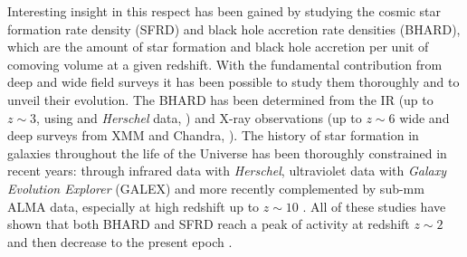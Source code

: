 
Interesting insight in this respect has been gained by studying the cosmic star formation rate density (SFRD) and black hole accretion rate densities (BHARD), which are the amount of star formation and black hole accretion per unit of comoving volume at a given redshift. With the fundamental contribution from deep and wide field surveys it has been possible to study them thoroughly and to unveil their evolution.
The BHARD has been determined from the IR (up to $z\sim3$, using and \emph{Herschel} data, \citet{2014MNRAS.439.2736D}) and X-ray observations (up to $z\sim 6$ wide and deep surveys from XMM and Chandra, \citet{2018MNRAS.473.2378V}). 
The history of star formation in galaxies throughout the life of the Universe has been thoroughly constrained in recent years: %
through infrared data with \emph{Herschel}, ultraviolet data with \emph{Galaxy Evolution Explorer} (GALEX) \citep[see][for a review]{2014ARA&A..52..415M} and more recently complemented by sub-mm ALMA data, especially at high redshift up to $z\sim10$ \citep{2020ApJ...902..112B,2020A&A...643A...8G}. %
All of these studies have shown that both BHARD and SFRD reach a peak of activity at redshift $z\sim2$ and then decrease to the present epoch \citep{1998MNRAS.293L..49B}.

